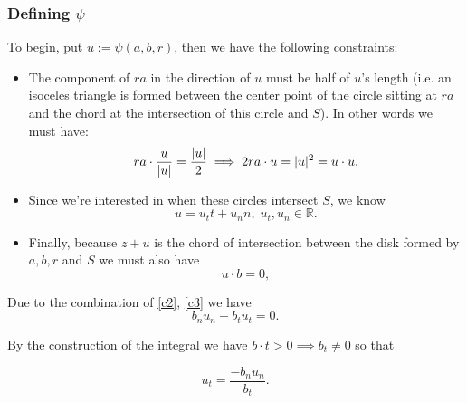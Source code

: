 \documentclass{article}
\begin{document}
\subsubsection{Defining $\psi$} \label{defpsi}
To begin, put $u := \psi(a, b, r)$, then we have the following constraints:
\begin{itemize}
  \item The component of $ra$ in the direction of $u$ must be half of $u$'s length (i.e. an isoceles triangle is formed between the center point of the circle sitting at $ra$ and the chord at the intersection of this circle and $S$). In other words we must have:
    \begin{equation}
      ra \cdot \frac{u}{\lvert u\rvert} = \frac{\lvert u\rvert}{2} \implies 2 ra \cdot u = \lvert u\rvert^2 = u\cdot u, \label{c1}
    \end{equation}
  \item Since we're interested in when these circles intersect $S$, we know
    \begin{equation}
      u = u_t t + u_n n, \; u_t, u_n \in \mathbb{R}. \label{c3}
    \end{equation}
  \item Finally, because $z + u$ is the chord of intersection between the disk formed by $a, b, r$ and $S$ we must also have
    \begin{equation}
      u \cdot b = 0, \label{c2}
    \end{equation}
\end{itemize}
Due to the combination of \eqref{c2}, \eqref{c3} we have
$$
  b_n u_n + b_t u_t = 0.
$$

By the construction of the integral we have $b \cdot t > 0 \implies b_t \neq 0$ so that

\begin{equation}
  u_t = \frac{-b_n u_n}{b_t}. \label{e4}
\end{equation}
\end{document}
